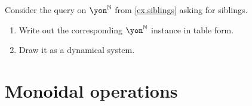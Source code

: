 \documentclass[Book-Poly]{subfiles}
\begin{document}
%

\begin{exercise}
Consider the query on $\yon^\nn$ from \cref{ex.siblings} asking for siblings. 
\begin{enumerate}
	\item Write out the corresponding $\yon^\nn$ instance in table form.
	\item Draw it as a dynamical system.
\end{enumerate}
\end{exercise}

\section{Monoidal operations}
\end{document}
